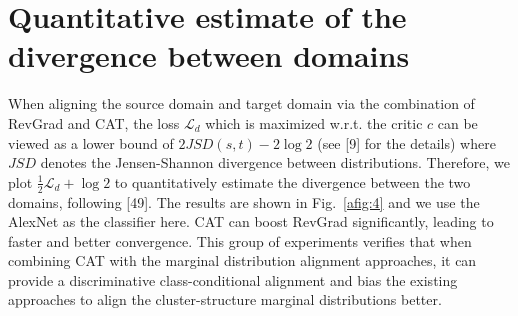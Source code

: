 \documentclass[10pt,twocolumn,letterpaper]{article}
\begin{document}
\section{Quantitative estimate of the divergence between domains}
When aligning the source domain and target domain via the combination of RevGrad and CAT, the loss $\mathcal{L}_d$ which is maximized w.r.t. the critic $c$ can be viewed as a lower bound of $2JSD(s, t)-2\log2$ (see [9] for the details) where $JSD$ denotes the Jensen-Shannon divergence between distributions. Therefore, we plot $\frac{1}{2}\mathcal{L}_d+\log2$ to quantitatively estimate the divergence between the two domains, following [49]. The results are shown in Fig.~\ref{afig:4} and we use the AlexNet as the classifier here. CAT can boost RevGrad significantly, leading to faster and better convergence. This group of experiments verifies that when combining CAT with the marginal distribution alignment approaches, it can provide a discriminative class-conditional alignment and bias the existing approaches to align the cluster-structure marginal distributions better.
\end{document}
